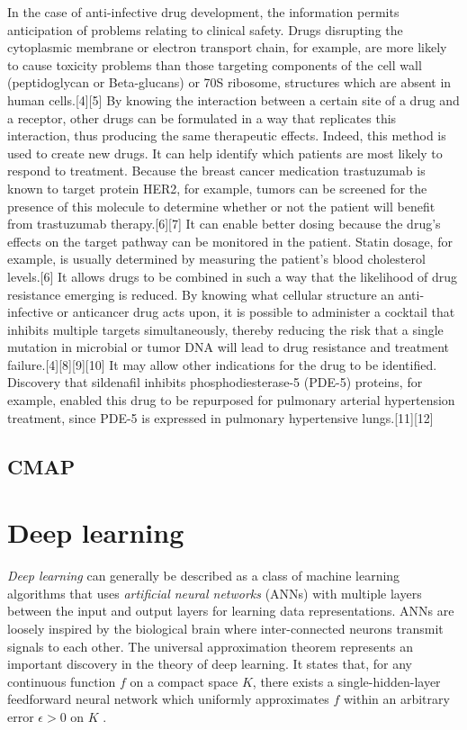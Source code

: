\documentclass[bsc,frontabs,twoside,singlespacing,parskip,deptreport]{infthesis}     %
\let\Oldsection\section
\renewcommand{\section}{\FloatBarrier\Oldsection}
\let\Oldsubsection\subsection
\renewcommand{\subsection}{\FloatBarrier\Oldsubsection}
\begin{document}
In the case of anti-infective drug development, the information permits anticipation of problems relating to clinical safety. Drugs disrupting the cytoplasmic membrane or electron transport chain, for example, are more likely to cause toxicity problems than those targeting components of the cell wall (peptidoglycan or Beta-glucans) or 70S ribosome, structures which are absent in human cells.[4][5]
By knowing the interaction between a certain site of a drug and a receptor, other drugs can be formulated in a way that replicates this interaction, thus producing the same therapeutic effects. Indeed, this method is used to create new drugs.
It can help identify which patients are most likely to respond to treatment. Because the breast cancer medication trastuzumab is known to target protein HER2, for example, tumors can be screened for the presence of this molecule to determine whether or not the patient will benefit from trastuzumab therapy.[6][7]
It can enable better dosing because the drug's effects on the target pathway can be monitored in the patient. Statin dosage, for example, is usually determined by measuring the patient's blood cholesterol levels.[6]
It allows drugs to be combined in such a way that the likelihood of drug resistance emerging is reduced. By knowing what cellular structure an anti-infective or anticancer drug acts upon, it is possible to administer a cocktail that inhibits multiple targets simultaneously, thereby reducing the risk that a single mutation in microbial or tumor DNA will lead to drug resistance and treatment failure.[4][8][9][10]
It may allow other indications for the drug to be identified. Discovery that sildenafil inhibits phosphodiesterase-5 (PDE-5) proteins, for example, enabled this drug to be repurposed for pulmonary arterial hypertension treatment, since PDE-5 is expressed in pulmonary hypertensive lungs.[11][12]

\subsection{CMAP}
\section{Deep learning}
\textit{Deep learning} can generally be described as a class of machine learning algorithms that uses \textit{artificial neural networks} (ANNs) with multiple layers between the input and output layers for learning data representations. ANNs are loosely inspired by the biological brain where inter-connected neurons transmit signals to each other.
The universal approximation theorem represents an important discovery in the theory of deep learning. It states that, for any continuous function \(f\) on a compact space \(K\), there exists a single-hidden-layer feedforward neural network which uniformly approximates \(f\) within an arbitrary error \(\epsilon>0\) on \(K\) \cite{hornik_multilayer_1989}.
\end{document}
